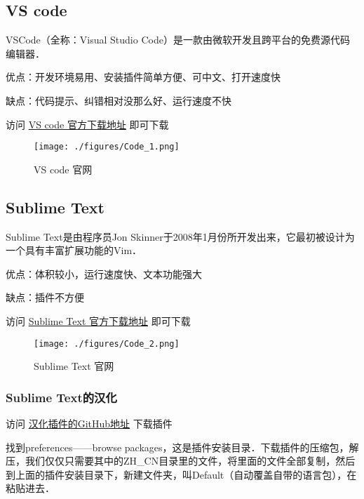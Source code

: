 
\begin{issues}
\issueTODO
\end{issues}

\subsection{VS code}

VSCode（全称：Visual Studio Code）是一款由微软开发且跨平台的免费源代码编辑器．

优点：开发环境易用、安装插件简单方便、可中文、打开速度快

缺点：代码提示、纠错相对没那么好、运行速度不快

访问 \href{https://code.visualstudio.com/}{VS code 官方下载地址} 即可下载

\begin{figure}[ht]
\centering
\texttt{[image: ./figures/Code\_1.png]}
\caption{VS code 官网} \label{Code_fig1}
\end{figure}

\subsection{Sublime Text}

Sublime Text是由程序员Jon Skinner于2008年1月份所开发出来，它最初被设计为一个具有丰富扩展功能的Vim．

优点：体积较小，运行速度快、文本功能强大

缺点：插件不方便

访问 \href{https://www.sublimetext.com/}{Sublime Text 官方下载地址} 即可下载

\begin{figure}[ht]
\centering
\texttt{[image: ./figures/Code\_2.png]}
\caption{Sublime Text 官网} \label{Code_fig2}
\end{figure}

\subsubsection{Sublime Text的汉化}

访问 \href{https://github.com/rexdf/ChineseLocalization}{汉化插件的GitHub地址} 下载插件

找到preferences——browse packages，这是插件安装目录．下载插件的压缩包，解压，我们仅仅只需要其中的ZH_CN目录里的文件，将里面的文件全部复制，然后到上面的插件安装目录下，新建文件夹，叫Default（自动覆盖自带的语言包），在粘贴进去．




